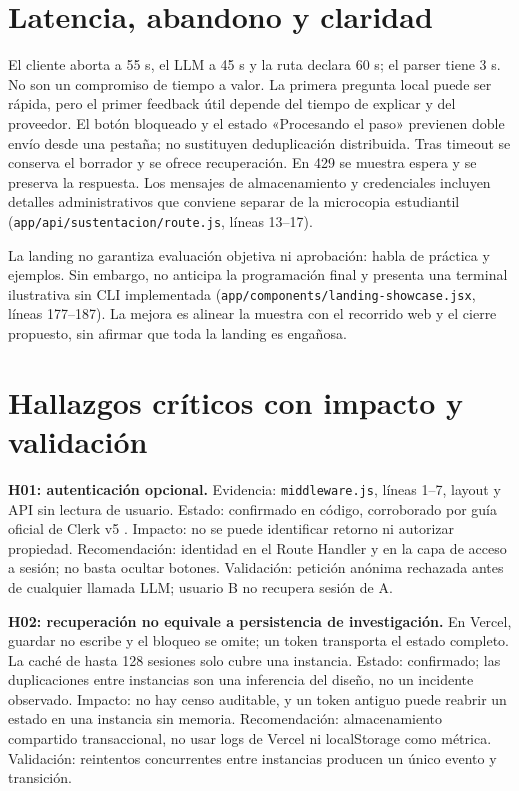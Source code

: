 \documentclass[11pt,a4paper]{report}
\newcommand{\src}[2]{\nolinkurl{#1}, líneas #2}
\begin{document}
\section{Latencia, abandono y claridad}
El cliente aborta a 55 s, el LLM a 45 s y la ruta declara 60 s; el parser tiene 3 s. No son un compromiso de tiempo a valor. La primera pregunta local puede ser rápida, pero el primer feedback útil depende del tiempo de explicar y del proveedor. El botón bloqueado y el estado «Procesando el paso» previenen doble envío desde una pestaña; no sustituyen deduplicación distribuida. Tras timeout se conserva el borrador y se ofrece recuperación. En 429 se muestra espera y se preserva la respuesta. Los mensajes de almacenamiento y credenciales incluyen detalles administrativos que conviene separar de la microcopia estudiantil (\src{app/api/sustentacion/route.js}{13--17}).

La landing no garantiza evaluación objetiva ni aprobación: habla de práctica y ejemplos. Sin embargo, no anticipa la programación final y presenta una terminal ilustrativa sin CLI implementada (\src{app/components/landing-showcase.jsx}{177--187}). La mejora es alinear la muestra con el recorrido web y el cierre propuesto, sin afirmar que toda la landing es engañosa.

\section{Hallazgos críticos con impacto y validación}
\textbf{H01: autenticación opcional.} Evidencia: \src{middleware.js}{1--7}, layout y API sin lectura de usuario. Estado: confirmado en código, corroborado por guía oficial de Clerk v5 \cite{clerk5}. Impacto: no se puede identificar retorno ni autorizar propiedad. Recomendación: identidad en el Route Handler y en la capa de acceso a sesión; no basta ocultar botones. Validación: petición anónima rechazada antes de cualquier llamada LLM; usuario B no recupera sesión de A.

\textbf{H02: recuperación no equivale a persistencia de investigación.} En Vercel, guardar no escribe y el bloqueo se omite; un token transporta el estado completo. La caché de hasta 128 sesiones solo cubre una instancia. Estado: confirmado; las duplicaciones entre instancias son una inferencia del diseño, no un incidente observado. Impacto: no hay censo auditable, y un token antiguo puede reabrir un estado en una instancia sin memoria. Recomendación: almacenamiento compartido transaccional, no usar logs de Vercel ni localStorage como métrica. Validación: reintentos concurrentes entre instancias producen un único evento y transición.
\end{document}
